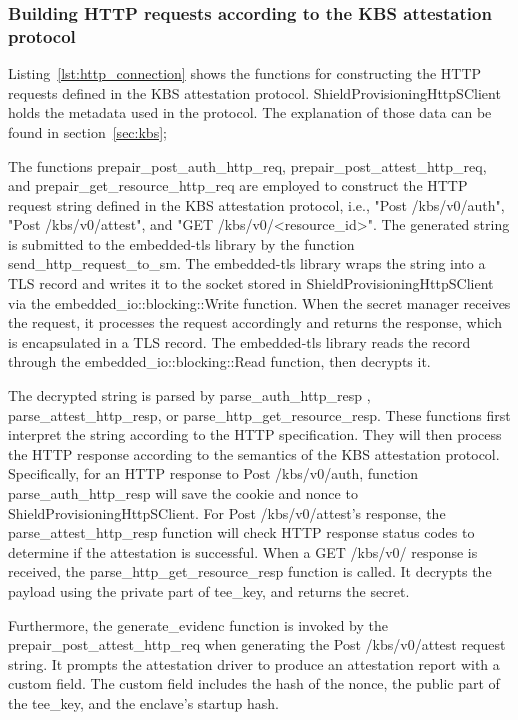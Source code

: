 \subsubsection{Building HTTP requests according to the KBS attestation protocol}
Listing~\ref{lst:http_connection} shows the functions for constructing the HTTP requests defined in the KBS attestation protocol. ShieldProvisioningHttpSClient holds the metadata used in the protocol. The explanation of those data can be found in section~\ref{sec:kbs};


The functions prepair\_post\_auth\_http\_req, prepair\_post\_attest\_http\_req, and prepair\_get\_resource\_http\_req are employed to construct the HTTP request string defined in the KBS attestation protocol, i.e., "Post /kbs/v0/auth", "Post /kbs/v0/attest", and "GET /kbs/v0/<resource\_id>". 
The generated string is submitted to the embedded-tls library by the function send\_http\_request\_to\_sm. The embedded-tls library wraps the string into a TLS record and writes it to the socket stored in ShieldProvisioningHttpSClient via the embedded\_io::blocking::Write 
function. When the secret manager receives the request, it processes the request accordingly and returns the response, which is encapsulated in a TLS record. The embedded-tls library reads the record through the embedded\_io::blocking::Read function, then decrypts it.

The decrypted string is parsed by parse\_auth\_http\_resp , parse\_attest\_http\_resp, or parse\_http\_get\_resource\_resp. These functions first interpret the string according to the HTTP specification. They will then process the HTTP 
response according to the semantics of the KBS attestation protocol. Specifically, for an HTTP response to Post /kbs/v0/auth, function parse\_auth\_http\_resp will save the cookie and nonce to ShieldProvisioningHttpSClient. For Post /kbs/v0/attest's response, the parse\_attest\_http\_resp function will 
check HTTP response status codes to determine if the attestation is successful. When a GET /kbs/v0/ response is received, the parse\_http\_get\_resource\_resp function is called. It decrypts the payload using the private part of tee\_key, and returns the secret.

Furthermore, the generate\_evidenc function is invoked by the prepair\_post\_attest\_http\_req when generating the Post /kbs/v0/attest request string. It prompts the attestation driver to produce an attestation report with a custom field. The custom field includes the hash of the nonce, 
the public part of the tee\_key, and the enclave's startup hash.                                                                                                                                                                                                                                                                                                


